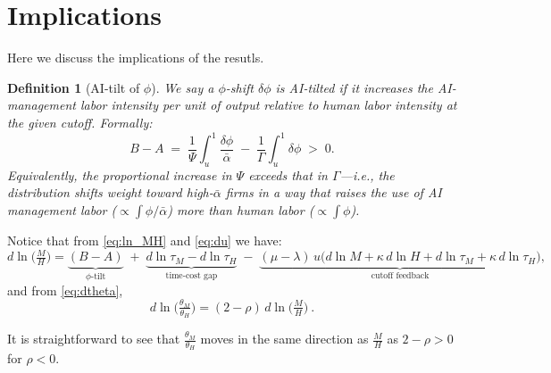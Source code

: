 \documentclass[english]{article}
\newtheorem{definition}{Definition}
\begin{document}
\section*{Implications}

Here we discuss the implications of the resutls.


\newpage


\begin{definition}[AI-tilt of $\phi$]
We say a $\phi$-shift $\delta\phi$ is \emph{AI-tilted} if it increases the \emph{AI-management labor intensity per unit of output} relative to human labor intensity at the given cutoff. Formally:
\[
B-A 
\;=\; 
\frac{1}{\Psi}\int_u^1\frac{\delta\phi}{\bar\alpha} \;-\; \frac{1}{\Gamma}\int_u^1\delta\phi 
\;>\; 
0.
\]
Equivalently, the proportional increase in $\Psi$ exceeds that in $\Gamma$---i.e., the distribution shifts weight toward high-$\bar\alpha$ firms in a way that raises the use of AI management labor ($\propto \int\phi/\bar\alpha$) more than human labor ($\propto \int\phi$).
\end{definition}



Notice that from \eqref{eq:ln_MH} and \eqref{eq:du} we have:
\[
\boxed{
d\ln\!\Big(\tfrac{M}{H}\Big)
=\underbrace{(B-A)}_{\text{$\phi$-tilt}}
\;+\;\underbrace{d\ln\tau_M-d\ln\tau_H}_{\text{time-cost gap}}
\;-\;\underbrace{(\mu-\lambda)\,u\Big(d\ln M+\kappa\,d\ln H+d\ln\tau_M+\kappa\,d\ln\tau_H\Big)}_{\text{cutoff feedback}},
}
\]
and from \eqref{eq:dtheta},
\[
\boxed{\ d\ln\!\Big(\tfrac{\theta_M}{\theta_H}\Big)=(2-\rho)\,d\ln\!\Big(\tfrac{M}{H}\Big)\ .\ }
\]

It is straightforward to see that $\frac{\theta_M}{\theta_H}$ moves in the same direction as $\frac{M}{H}$ as $2-\rho>0$ for $\rho<0$.
\end{document}
